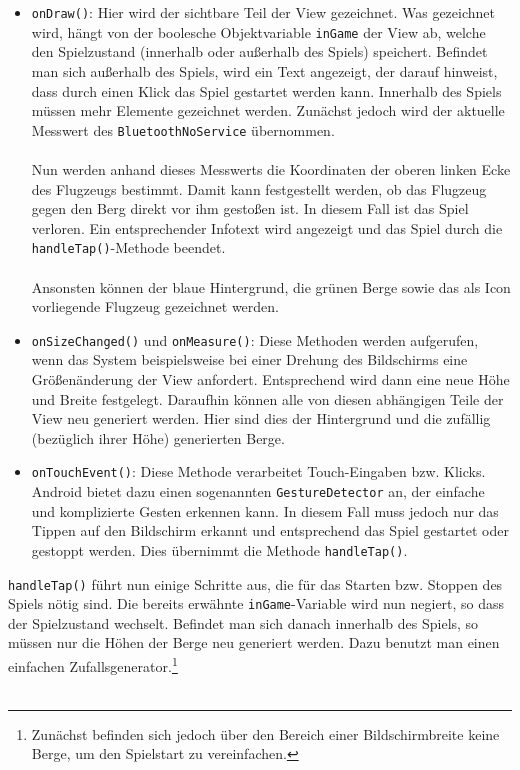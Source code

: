 \begin{itemize}
	\item \texttt{onDraw()}: Hier wird der sichtbare Teil der View gezeichnet.\cite{Src:CustomView} \cite{Src:AndroidKuenneth} Was gezeichnet wird, hängt von der boolesche Objektvariable \texttt{inGame} der View ab, welche den Spielzustand (innerhalb oder außerhalb des Spiels) speichert. Befindet man sich außerhalb des Spiels, wird ein Text angezeigt, der darauf hinweist, dass durch einen Klick das Spiel gestartet werden kann. Innerhalb des Spiels müssen mehr Elemente gezeichnet werden. Zunächst jedoch wird der aktuelle Messwert des \texttt{BluetoothNoService} übernommen. \\ \\
	Nun werden anhand dieses Messwerts die Koordinaten der oberen linken Ecke des Flugzeugs bestimmt. Damit kann festgestellt werden, ob das Flugzeug gegen den Berg direkt vor ihm gestoßen ist. In diesem Fall ist das Spiel verloren. Ein entsprechender Infotext wird angezeigt und das Spiel durch die \texttt{handleTap()}-Methode beendet. \\ \\
	Ansonsten können der blaue Hintergrund, die grünen Berge sowie das als Icon vorliegende Flugzeug gezeichnet werden.
	\item \texttt{onSizeChanged()} und \texttt{onMeasure()}: Diese Methoden werden aufgerufen, wenn das System beispielsweise bei einer Drehung des Bildschirms eine Größenänderung der View anfordert.\cite{Src:CustomView} Entsprechend wird dann eine neue Höhe und Breite festgelegt. Daraufhin können alle von diesen abhängigen Teile der View neu generiert werden. Hier sind dies der Hintergrund und die zufällig (bezüglich ihrer Höhe) generierten Berge.
	\item \texttt{onTouchEvent()}: Diese Methode verarbeitet Touch-Eingaben bzw. Klicks. \cite{Src:InteractiveView} Android bietet dazu einen sogenannten \texttt{GestureDetector} an, der einfache und komplizierte Gesten erkennen kann. In diesem Fall muss jedoch nur das Tippen auf den Bildschirm erkannt und entsprechend das Spiel gestartet oder gestoppt werden. Dies übernimmt die Methode \texttt{handleTap()}.
\end{itemize}
\texttt{handleTap()} führt nun einige Schritte aus, die für das Starten bzw. Stoppen des Spiels nötig sind. Die bereits erwähnte \texttt{inGame}-Variable wird nun negiert, so dass der Spielzustand wechselt. Befindet man sich danach innerhalb des Spiels, so müssen nur die Höhen der Berge neu generiert werden. Dazu benutzt man einen einfachen Zufallsgenerator.\footnote[7]{Zunächst befinden sich jedoch über den Bereich einer Bildschirmbreite keine Berge, um den Spielstart zu vereinfachen.} \\ \\
